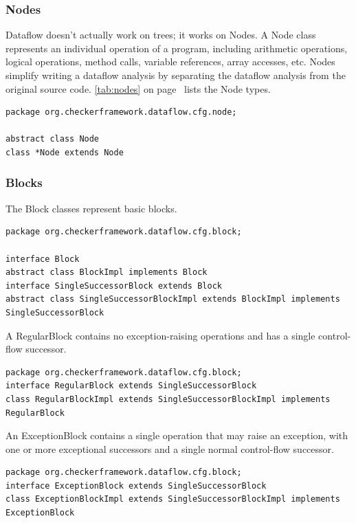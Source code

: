 \subsubsection{Nodes}
\label{sec:node_classes}

Dataflow doesn't actually work on trees; it works on Nodes.
A Node class represents an individual operation of a program,
including arithmetic operations, logical operations, method calls,
variable references, array accesses, etc.
Nodes
simplify writing a dataflow analysis by separating the dataflow
analysis from the original source code.
\autoref{tab:nodes} on page~\pageref{tab:nodes} lists
the Node types.

\begin{verbatim}
package org.checkerframework.dataflow.cfg.node;

abstract class Node
class *Node extends Node
\end{verbatim}


\subsubsection{Blocks}
\label{sec:block_classes}

The Block
classes represent basic blocks.

\begin{verbatim}
package org.checkerframework.dataflow.cfg.block;

interface Block
abstract class BlockImpl implements Block
interface SingleSuccessorBlock extends Block
abstract class SingleSuccessorBlockImpl extends BlockImpl implements SingleSuccessorBlock
\end{verbatim}

A RegularBlock contains no exception-raising operations and has a
single control-flow successor.

\begin{verbatim}
package org.checkerframework.dataflow.cfg.block;
interface RegularBlock extends SingleSuccessorBlock
class RegularBlockImpl extends SingleSuccessorBlockImpl implements RegularBlock
\end{verbatim}

An ExceptionBlock contains a single operation that may raise an
exception, with one or more exceptional successors and a single normal
control-flow successor.

\begin{verbatim}
package org.checkerframework.dataflow.cfg.block;
interface ExceptionBlock extends SingleSuccessorBlock
class ExceptionBlockImpl extends SingleSuccessorBlockImpl implements ExceptionBlock
\end{verbatim}

